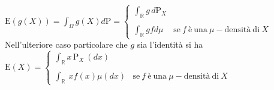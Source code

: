 \documentclass[a4paper,11pt]{article}
\theoremstyle{plain}
\theoremstyle{definition}
\theoremstyle{remark}
\begin{document}
\noindent
$\displaystyle \mathrm{E}(g(X))=\displaystyle \int_{\Omega}g(X)d\mathrm{P}=\left\{\begin{array}{ll}
\displaystyle \int_{\mathbb{R}}g\, d\mathrm{P}_{X} & \\
 & \\
\displaystyle \int_{\mathbb{R}}gfd\mu & \mathrm{s}\mathrm{e}\ f\ \text{\`{e}}\ \mathrm{u}\mathrm{n}\mathrm{a}\ \mu- \mathrm{d}\mathrm{e}\mathrm{n}\mathrm{s}\mathrm{i}\mathrm{t}\text{\`{a}}\ \mathrm{d}\mathrm{i}\ X
\end{array}\right.$\\

\noindent
Nell'ulteriore caso particolare che $g$ sia l'identit\`{a} si ha \\

\noindent
$\mathrm{E}(X)=\left\{\begin{array}{ll}
\displaystyle \int_{\mathbb{R}}x \,\mathrm{P}_{X}\ (dx) & \\
 & \\
\displaystyle \int_{\mathbb{R}}\ x f(x)\mu(dx) & \mathrm{s}\mathrm{e}\ f\ \text{\`{e}}\ \mathrm{u}\mathrm{n}\mathrm{a}\ \mu- \mathrm{d}\mathrm{e}\mathrm{n}\mathrm{s}\mathrm{i}\mathrm{t}\text{\`{a}}\ \mathrm{d}\mathrm{i}\ X
\end{array}\right.$
\end{document}
